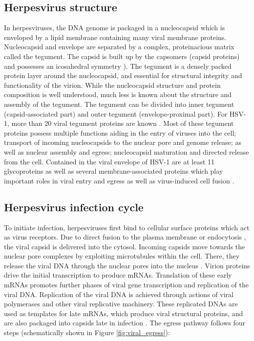 \subsection{Herpesvirus structure}
In herpesviruses, the DNA genome is packaged in a nucleocapsid which is enveloped by a lipid membrane containing many viral membrane proteins.
Nucleocapsid and envelope are separated by a complex, proteinacious matrix called the tegument.
The capsid is built up by the capsomers (capsid proteins) and possesses an icosahedral symmetry \cite{[4]}).
The tegument is a densely packed protein layer around the nucleocapsid, and essential for structural integrity and functionality of the virion.
While the nucleocapsid structure and protein composition is well understood, much less is known about the structure and assembly of the tegument.
The tegument can be divided into inner tegument (capsid-associated part) and outer tegument (envelope-proximal part).
For HSV-1, more than 20 viral tegument proteins are known \cite{[5, 6]}.
Most of these tegument proteins possess multiple functions aiding in the entry of viruses into the cell; transport of incoming nucleocapsids to the nuclear pore and genome release; as well as nuclear assembly and egress; nucleocapsid maturation and directed release from the cell.
Contained in the viral envelope of HSV-1 are at least 11 glycoproteins as well as several membrane-associated proteins which play important roles in viral entry and egress as well as virus-induced cell fusion \cite{[2, 7]}.

\subsection{Herpesvirus infection cycle}
To initiate infection, herpesviruses first bind to cellular surface proteins which act as virus receptors.
Due to direct fusion to the plasma membrane or endocytosis \cite{[8]}, the viral capsid is delivered into the cytosol.
Incoming capsids move towards the nuclear pore complexes by exploiting microtubules within the cell\cite{[9, 10]}.
There, they release the viral DNA through the nuclear pores into the nucleus \cite{[11]}.
Virion proteins drive the initial transcription to produce %
mRNAs.
Translation of these early mRNAs promotes further phases of viral gene transcription and replication of the viral DNA.
Replication of the viral DNA is achieved through actions of viral polymerases and other viral replicative machinery.
These replicated DNAs are used as templates for late mRNAs, which produce viral structural proteins, and are also packaged into capsids late in infection \cite{[4]}.
The egress pathway follows four steps (schematically shown in Figure \ref{fig:viral_egress}):

